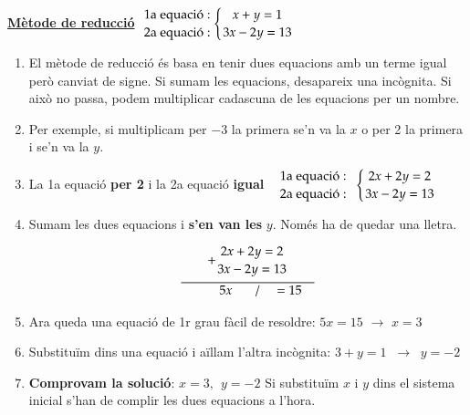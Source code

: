 \vspace{-0.5cm}
\begin{example}[*]
	\textbf{\large \underline{Mètode de reducció}}  \quad\quad\quad\quad
	$\genfrac{}{}{0pt}{0}{\text{  1a  equaci\'o}:}{\text{  2a  equaci\'o}:} \left\{\genfrac{}{}{0pt}{0}{x+y=1}{3x-2y=13}\right.$
	
	
	\begin{enumerate}
		\item  El m\`etode de reducci\'o \'es basa en tenir dues equacions amb un terme igual 
	 per\`o canviat de signe. Si sumam les equacions, desapareix una inc\`ognita. 
	 Si aix\`o no passa, podem multiplicar cadascuna de les equacions per un nombre. 
		
		
		\item  Per exemple, si multiplicam per  $-3$ la primera se'n va la  $x$ o per 2 la primera i se'n va la  $y$. 
		
		
		\item 	 La  1a equaci\'o  \textbf{per 2} i la 2a equaci\'o \textbf{igual} \ 
		$\genfrac{}{}{0pt}{0}{\text{ 1a  equaci\'o}:}{\text{ 2a  equaci\'o}:}\ \ \left\{\genfrac{}{}{0pt}{0}{2x+2y=2}{3x-2y=13}\right.$
		
		\item  Sumam les dues equacions i \textbf{s'en van les } $y$.  Nom\'es ha de quedar
		una lletra.
		
	 \[
	  \begin{gathered}+ \genfrac{}{}{0pt}{0}{2x+2y=2}{3x-2y=13}\\  \overline{ \quad \quad \ \ \ \ 5x\ \ \ \quad / \ \ \ \ =15 \quad} \end{gathered} \]
		
		\item Ara queda una equaci\'o de 1r grau f\`acil de resoldre:   $5x=15$   $\rightarrow $   $x=3$ 
		
		\item Substitu\"im dins una equaci\'o i a\"illam l'altra inc\`ognita:  $3+y=1\;\;\rightarrow \;\;y=-2$
		\item
		\textbf{ Comprovam la soluci\'o}: $\boxed{x=3,\ \ y=-2}$  Si substitu\"im $x$ i $y$ dins el sistema inicial s'han de complir les dues equacions a l'hora.
		
	\end{enumerate}	
\end{example}



